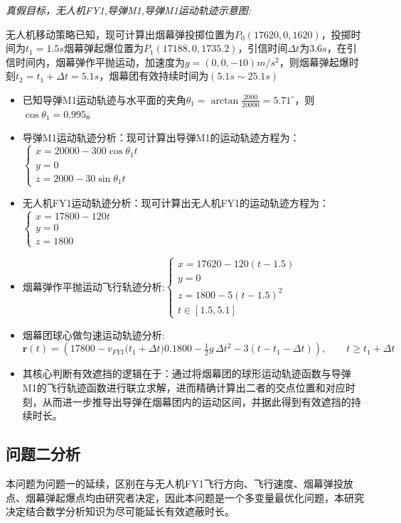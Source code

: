 \documentclass{article}
\begin{document}
\textit{真假目标，无人机FY1,导弹M1,导弹M1运动轨迹示意图:}


无人机移动策略已知，现可计算出烟幕弹投掷位置为$P_0(17620,0,1620)$，投掷时间为$t_1 = 1.5s$烟幕弹起爆位置为$P_1(17188,0,1735.2)$，引信时间$\Delta t$为$3.6s$，在引信时间内，烟幕弹作平抛运动，加速度为$g = (0,0,-10)$$m/s^2$，则烟幕弹起爆时刻$t_2 = t_1 + \Delta t = 5.1s$，烟幕团有效持续时间为$(5.1s \sim25.1s)$

\begin{itemize}
    \item 已知导弹M1运动轨迹与水平面的夹角$\theta_1 = \arctan{\frac{2000}{20000}} = 5.71^\circ$，则$\cos\theta_1 = 0.995$。
    \item 导弹M1运动轨迹分析：现可计算出导弹M1的运动轨迹方程为：$\begin{cases}
        x = 20000 - 300 \cos\theta_1 t \\
        y = 0 \\
        z = 2000 - 30 \sin \theta_1t
    \end{cases}$
    \item 无人机FY1运动轨迹分析：现可计算出无人机FY1的运动轨迹方程为：$\begin{cases}
        x = 17800 - 120t \\
        y = 0 \\
        z = 1800 
    \end{cases}$
    \item 烟幕弹作平抛运动飞行轨迹分析:$\begin{cases}
        x = 17620 - 120(t - 1.5) \\
        y = 0 \\
        z = 1800  - 5(t - 1.5)^2 \\
        t \in [1.5,5.1]
    \end{cases}$
    \item 烟幕团球心做匀速运动轨迹分析:\[
\mathbf{r}(t)=\left(
17800 - v_{FY1}\big(t_1+ \Delta t)
0.1800 - \tfrac{1}{2}g\,\Delta t^{2} - 3(t - t_1 - \Delta t)
\right),
\qquad t \ge t_1 + \Delta t
\]
    \item 其核心判断有效遮挡的逻辑在于：通过将烟幕团的球形运动轨迹函数与导弹M1的飞行轨迹函数进行联立求解，进而精确计算出二者的交点位置和对应时刻，从而进一步推导出导弹在烟幕团内的运动区间，并据此得到有效遮挡的持续时长。
\end{itemize}

\subsection{问题二分析}
本问题为问题一的延续，区别在与无人机FY1飞行方向、飞行速度、烟幕弹投放点、烟幕弹起爆点均由研究者决定，因此本问题是一个多变量最优化问题，本研究决定结合数学分析知识为尽可能延长有效遮蔽时长。
\end{document}
